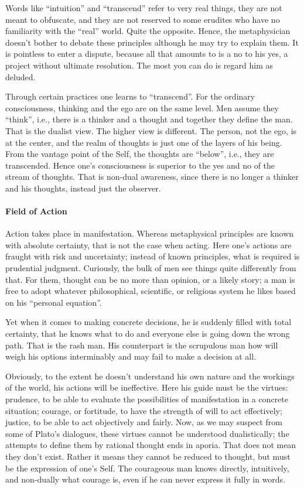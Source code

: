 Words like ``intuition'' and ``transcend'' refer to very real things, they are not meant to obfuscate, and they are not reserved to some erudites who have no familiarity with the ``real'' world. Quite the opposite. Hence, the metaphysician doesn't bother to debate these principles although he may try to explain them. It is pointless to enter a dispute, because all that amounts to is a no to his yes, a project without ultimate resolution. The most you can do is regard him as deluded.

Through certain practices one learns to ``transcend''. For the ordinary consciousness, thinking and the ego are on the same level. Men assume they ``think'', i.e., there is a thinker and a thought and together they define the man. That is the dualist view. The higher view is different. The person, not the ego, is at the center, and the realm of thoughts is just one of the layers of his being. From the vantage point of the Self, the thoughts are ``below'', i.e., they are transcended. Hence one's consciousness is superior to the yes and no of the stream of thoughts. That is non-dual awareness, since there is no longer a thinker and his thoughts, instead just the observer.

\paragraph{Field of Action}


Action takes place in manifestation. Whereas metaphysical principles are known with absolute certainty, that is not the case when acting. Here one's actions are fraught with risk and uncertainty; instead of known principles, what is required is prudential judgment. Curiously, the bulk of men see things quite differently from that. For them, thought can be no more than opinion, or a likely story; a man is free to adopt whatever philosophical, scientific, or religious system he likes based on his ``personal equation''.

Yet when it comes to making concrete decisions, he is suddenly filled with total certainty, that he knows what to do and everyone else is going down the wrong path. That is the rash man. His counterpart is the scrupulous man how will weigh his options interminably and may fail to make a decision at all.

Obviously, to the extent he doesn't understand his own nature and the workings of the world, his actions will be ineffective. Here his guide must be the virtues: prudence, to be able to evaluate the possibilities of manifestation in a concrete situation; courage, or fortitude, to have the strength of will to act effectively; justice, to be able to act objectively and fairly. Now, as we may suspect from some of Plato's dialogues, these virtues cannot be understood dualistically; the attempts to define them by rational thought ends in aporia. That does not mean they don't exist. Rather it means they cannot be reduced to thought, but must be the expression of one's Self. The courageous man knows directly, intuitively, and non-dually what courage is, even if he can never express it fully in words.

